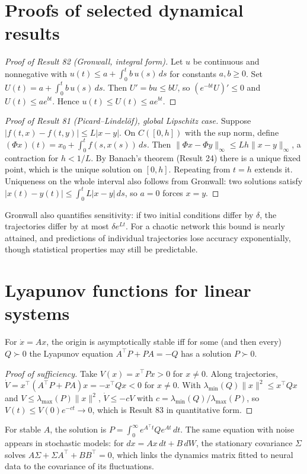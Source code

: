 \section{Proofs of selected dynamical results}
\begin{proof}[Proof of Result 82 (Gronwall, integral form)]
Let $u$ be continuous and nonnegative with
$u(t)\le a+\int_0^tb\,u(s)\,ds$ for constants $a,b\ge0$. Set
$U(t)=a+\int_0^tb\,u(s)\,ds$. Then $U'=bu\le bU$, so
$(e^{-bt}U)'\le0$ and $U(t)\le ae^{bt}$. Hence $u(t)\le U(t)\le ae^{bt}$.
\end{proof}
\begin{proof}[Proof of Result 81 (Picard--Lindel\"of), global Lipschitz case]
Suppose $|f(t,x)-f(t,y)|\le L|x-y|$. On $C([0,h])$ with the sup norm,
define $(\Phi x)(t)=x_0+\int_0^tf(s,x(s))\,ds$. Then
$\|\Phi x-\Phi y\|_\infty\le Lh\|x-y\|_\infty$, a contraction for $h<1/L$.
By Banach's theorem (Result 24) there is a unique fixed point, which is
the unique solution on $[0,h]$. Repeating from $t=h$ extends it.
Uniqueness on the whole interval also follows from Gronwall: two
solutions satisfy $|x(t)-y(t)|\le\int_0^tL|x-y|\,ds$, so $a=0$ forces
$x=y$.
\end{proof}
Gronwall also quantifies sensitivity: if two initial conditions differ by
$\delta$, the trajectories differ by at most $\delta e^{Lt}$. For a
chaotic network this bound is nearly attained, and predictions of
individual trajectories lose accuracy exponentially, though statistical
properties may still be predictable.

\section{Lyapunov functions for linear systems}
\begin{theorem}
For $\dot x=Ax$, the origin is asymptotically stable iff for some (and
then every) $Q\succ0$ the Lyapunov equation $A^\top P+PA=-Q$ has a
solution $P\succ0$.
\end{theorem}
\begin{proof}[Proof of sufficiency]
Take $V(x)=x^\top Px>0$ for $x\ne0$. Along trajectories,
$\dot V=x^\top(A^\top P+PA)x=-x^\top Qx<0$ for $x\ne0$. With
$\lambda_{\min}(Q)\|x\|^2\le x^\top Qx$ and $V\le\lambda_{\max}(P)\|x\|^2$,
$\dot V\le-cV$ with $c=\lambda_{\min}(Q)/\lambda_{\max}(P)$, so
$V(t)\le V(0)e^{-ct}\to0$, which is Result 83 in quantitative form.
\end{proof}
For stable $A$, the solution is $P=\int_0^\infty e^{A^\top t}Qe^{At}\,dt$.
The same equation with noise appears in stochastic models: for
$dx=Ax\,dt+B\,dW$, the stationary covariance $\Sigma$ solves
$A\Sigma+\Sigma A^\top+BB^\top=0$, which links the dynamics matrix fitted to
neural data to the covariance of its fluctuations.

